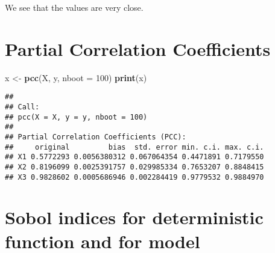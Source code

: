 \documentclass[
  11pt,
]{book}
\newenvironment{Shaded}{\begin{snugshade}}{\end{snugshade}}
\newcommand{\DataTypeTok}[1]{\textcolor[rgb]{0.13,0.29,0.53}{#1}}
\newcommand{\DecValTok}[1]{\textcolor[rgb]{0.00,0.00,0.81}{#1}}
\newcommand{\KeywordTok}[1]{\textcolor[rgb]{0.13,0.29,0.53}{\textbf{#1}}}
\newcommand{\NormalTok}[1]{#1}
\newcommand{\StringTok}[1]{\textcolor[rgb]{0.31,0.60,0.02}{#1}}
\begin{document}
We see that the values are very close.

\hypertarget{partial-correlation-coefficients}{%
\section{Partial Correlation Coefficients}\label{partial-correlation-coefficients}}

\begin{Shaded}
\begin{Highlighting}[]
\NormalTok{x <-}\StringTok{ }\KeywordTok{pcc}\NormalTok{(X, y, }\DataTypeTok{nboot =} \DecValTok{100}\NormalTok{)}
\KeywordTok{print}\NormalTok{(x)}
\end{Highlighting}
\end{Shaded}

\begin{verbatim}
## 
## Call:
## pcc(X = X, y = y, nboot = 100)
## 
## Partial Correlation Coefficients (PCC):
##     original         bias  std. error min. c.i. max. c.i.
## X1 0.5772293 0.0056380312 0.067064354 0.4471891 0.7179550
## X2 0.8196099 0.0025391757 0.029985334 0.7653207 0.8848415
## X3 0.9828602 0.0005686946 0.002284419 0.9779532 0.9884970
\end{verbatim}

\hypertarget{sobol-indices-for-deterministic-function-and-for-model}{%
\section{Sobol indices for deterministic function and for model}\label{sobol-indices-for-deterministic-function-and-for-model}}
\end{document}
